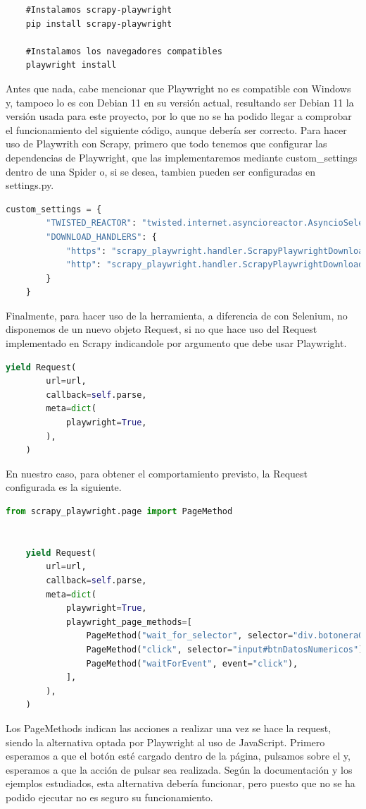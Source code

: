 \begin{verbatim}
	#Instalamos scrapy-playwright
	pip install scrapy-playwright
	
	#Instalamos los navegadores compatibles
	playwright install
\end{verbatim}

Antes que nada, cabe mencionar que Playwright no es compatible con Windows y, tampoco lo es con Debian 11 en su versión actual, resultando ser Debian 11 la versión usada para este proyecto, por lo que no se ha podido llegar a comprobar el funcionamiento del siguiente código, aunque debería ser correcto.\newline
\newline
Para hacer uso de Playwrith con Scrapy, primero que todo tenemos que configurar las dependencias de Playwright, que las implementaremos mediante custom\_settings dentro de una Spider o, si se desea, tambien pueden ser configuradas en settings.py.

\begin{lstlisting}[language=Python, caption={Configuración Playwright}]
	custom_settings = {
		"TWISTED_REACTOR": "twisted.internet.asyncioreactor.AsyncioSelectorReactor",
		"DOWNLOAD_HANDLERS": {
			"https": "scrapy_playwright.handler.ScrapyPlaywrightDownloadHandler",
			"http": "scrapy_playwright.handler.ScrapyPlaywrightDownloadHandler",
		}
	}
\end{lstlisting}

Finalmente, para hacer uso de la herramienta, a diferencia de con Selenium, no disponemos de un nuevo objeto Request, si no que hace uso del Request implementado en Scrapy indicandole por argumento que debe usar Playwright.

\begin{lstlisting}[language=Python, caption={Playwright basic Request}]
	yield Request(
		url=url,
		callback=self.parse,
		meta=dict(
			playwright=True,
		),
	)
\end{lstlisting}

En nuestro caso, para obtener el comportamiento previsto, la Request configurada es la siguiente.

\begin{lstlisting}[language=Python, caption={Agua en Navarra Playwright Request}]
	from scrapy_playwright.page import PageMethod
	
	
	yield Request(
		url=url,
		callback=self.parse,
		meta=dict(
			playwright=True,
			playwright_page_methods=[
				PageMethod("wait_for_selector", selector="div.botoneraGrafico", state="visible"),
				PageMethod("click", selector="input#btnDatosNumericos"),
				PageMethod("waitForEvent", event="click"),
			],
		),
	)
\end{lstlisting}

Los PageMethods indican las acciones a realizar una vez se hace la request, siendo la alternativa optada por Playwright al uso de JavaScript. Primero esperamos a que el botón esté cargado dentro de la página, pulsamos sobre el y, esperamos a que la acción de pulsar sea realizada.\newline
\newline
Según la documentación y los ejemplos estudiados, esta alternativa debería funcionar, pero puesto que no se ha podido ejecutar no es seguro su funcionamiento.
